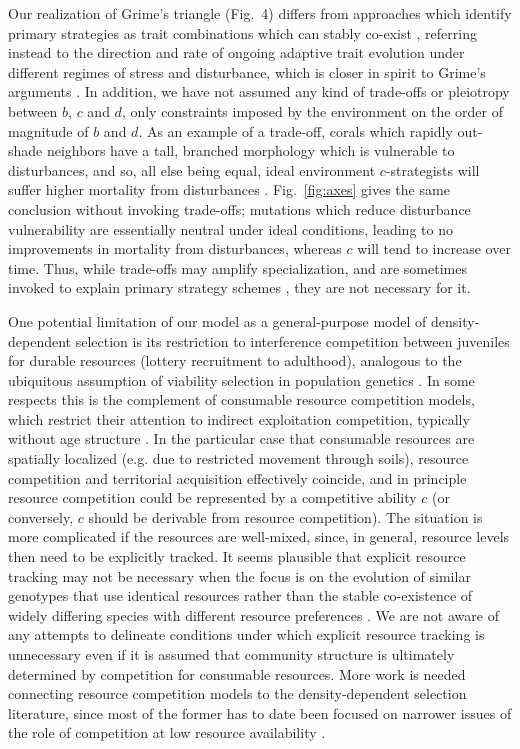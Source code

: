 \documentclass[11pt]{article}
\begin{document}
Our realization of Grime's triangle (Fig.~4) differs from approaches which identify primary strategies as trait combinations which can stably co-exist \citep{bolker_99}, referring instead to the direction and rate of ongoing adaptive trait evolution under different regimes of stress and disturbance, which is closer in spirit to Grime's arguments \citep{grime_1974,grime_1977}. In addition, we have not assumed any kind of trade-offs or pleiotropy between $b$, $c$ and $d$, only constraints imposed by the environment on the order of magnitude of $b$ and $d$. As an example of a trade-off, corals which rapidly out-shade neighbors have a tall, branched morphology which is vulnerable to disturbances, and so, all else being equal, ideal environment $c$-strategists will suffer higher mortality from disturbances \citep{darling_2012}. Fig.~\ref{fig:axes} gives the same conclusion without invoking trade-offs; mutations which reduce disturbance vulnerability are essentially neutral under ideal conditions, leading to no improvements in mortality from disturbances, whereas $c$ will tend to increase over time. Thus, while trade-offs may amplify specialization, and are sometimes invoked to explain primary strategy schemes \citep{macarthur_1967,winemiller_1992,aerts_1999}, they are not necessary for it.

One potential limitation of our model as a general-purpose model of density-dependent selection is its restriction to interference competition between juveniles for durable resources (lottery recruitment to adulthood), analogous to the ubiquitous assumption of viability selection in population genetics \citep[p. 45]{ewens_2004}. In some respects this is the complement of consumable resource competition models, which restrict their attention to indirect exploitation competition, typically without age structure \citep{tilman_1982}. In the particular case that consumable resources are spatially localized (e.g. due to restricted movement through soils), resource competition and territorial acquisition effectively coincide, and in principle resource competition could be represented by a competitive ability $c$ (or conversely, $c$ should be derivable from resource competition). The situation is more complicated if the resources are well-mixed, since, in general, resource levels then need to be explicitly tracked. It seems plausible that explicit resource tracking may not be necessary when the focus is on the evolution of similar genotypes that use identical resources rather than the stable co-existence of widely differing species with different resource preferences \citep{ram_2016}. We are not aware of any attempts to delineate conditions under which explicit resource tracking is unnecessary even if it is assumed that community structure is ultimately determined by competition for consumable resources. More work is needed connecting resource competition models to the density-dependent selection literature, since most of the former has to date been focused on narrower issues of the role of competition at low resource availability \citep{aerts_1999,davis_1998,tilman_2007}.  
\end{document}
